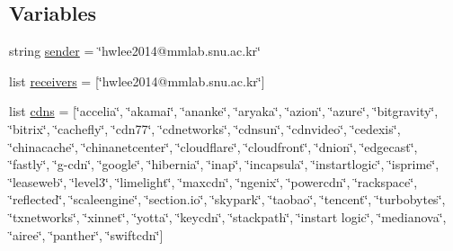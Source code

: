 \subsection*{Variables}
\begin{DoxyCompactItemize}
\item 
string \hyperlink{namespacesummarize_a4be54e246d619c974b7cd5043c89533b}{sender} = \char`\"{}hwlee2014@mmlab.\-snu.\-ac.\-kr\char`\"{}
\item 
list \hyperlink{namespacesummarize_a0307113d73aaad175b394fce0138f5a3}{receivers} = \mbox{[}\char`\"{}hwlee2014@mmlab.\-snu.\-ac.\-kr\char`\"{}\mbox{]}
\item 
list \hyperlink{namespacesummarize_a6a33e0d2e15dece13ba677f313d425ed}{cdns} = \mbox{[}\char`\"{}accelia\char`\"{}, \char`\"{}akamai\char`\"{}, \char`\"{}ananke\char`\"{}, \char`\"{}aryaka\char`\"{}, \char`\"{}azion\char`\"{}, \char`\"{}azure\char`\"{}, \char`\"{}bitgravity\char`\"{}, \char`\"{}bitrix\char`\"{}, \char`\"{}cachefly\char`\"{}, \char`\"{}cdn77\char`\"{}, \char`\"{}cdnetworks\char`\"{}, \char`\"{}cdnsun\char`\"{}, \char`\"{}cdnvideo\char`\"{}, \char`\"{}cedexis\char`\"{}, \char`\"{}chinacache\char`\"{}, \char`\"{}chinanetcenter\char`\"{}, \char`\"{}cloudflare\char`\"{}, \char`\"{}cloudfront\char`\"{}, \char`\"{}dnion\char`\"{}, \char`\"{}edgecast\char`\"{}, \char`\"{}fastly\char`\"{}, \char`\"{}g-\/cdn\char`\"{}, \char`\"{}google\char`\"{}, \char`\"{}hibernia\char`\"{}, \char`\"{}inap\char`\"{}, \char`\"{}incapsula\char`\"{}, \char`\"{}instartlogic\char`\"{}, \char`\"{}isprime\char`\"{}, \char`\"{}leaseweb\char`\"{}, \char`\"{}level3\char`\"{}, \char`\"{}limelight\char`\"{}, \char`\"{}maxcdn\char`\"{}, \char`\"{}ngenix\char`\"{}, \char`\"{}powercdn\char`\"{}, \char`\"{}rackspace\char`\"{}, \char`\"{}reflected\char`\"{}, \char`\"{}scaleengine\char`\"{}, \char`\"{}section.\-io\char`\"{}, \char`\"{}skypark\char`\"{}, \char`\"{}taobao\char`\"{}, \char`\"{}tencent\char`\"{}, \char`\"{}turbobytes\char`\"{}, \char`\"{}txnetworks\char`\"{}, \char`\"{}xinnet\char`\"{}, \char`\"{}yotta\char`\"{}, \char`\"{}keycdn\char`\"{}, \char`\"{}stackpath\char`\"{}, \char`\"{}instart logic\char`\"{}, \char`\"{}medianova\char`\"{}, \char`\"{}airee\char`\"{}, \char`\"{}panther\char`\"{}, \char`\"{}swiftcdn\char`\"{}\mbox{]}
\end{DoxyCompactItemize}


